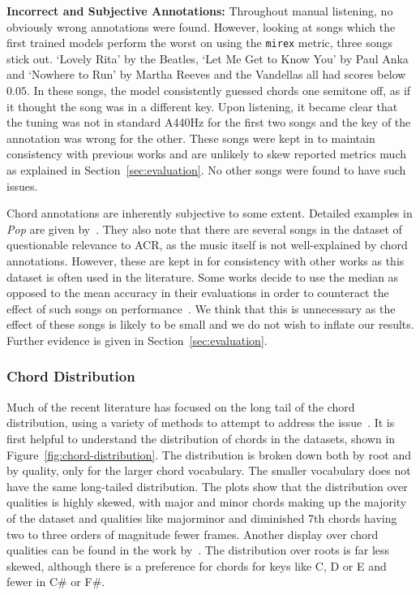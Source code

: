 \textbf{Incorrect and Subjective Annotations:} Throughout manual listening, no obviously wrong annotations were found. However, looking at songs which the first trained models perform the worst on using the \texttt{mirex} metric, three songs stick out. `Lovely Rita' by the Beatles, `Let Me Get to Know You' by Paul Anka and `Nowhere to Run' by Martha Reeves and the Vandellas all had scores below $0.05$. In these songs, the model consistently guessed chords one semitone off, as if it thought the song was in a different key. Upon listening, it became clear that the tuning was not in standard A440Hz for the first two songs and the key of the annotation was wrong for the other. These songs were kept in to maintain consistency with previous works and are unlikely to skew reported metrics much as explained in Section~\ref{sec:evaluation}. No other songs were found to have such issues.

Chord annotations are inherently subjective to some extent. Detailed examples in \emph{Pop} are given by~\citet{FourTimelyInsights}. They also note that there are several songs in the dataset of questionable relevance to ACR, as the music itself is not well-explained by chord annotations. However, these are kept in for consistency with other works as this dataset is often used in the literature. Some works decide to use the median as opposed to the mean accuracy in their evaluations in order to counteract the effect of such songs on performance~\citep{StructuredTraining}. We think that this is unnecessary as the effect of these songs is likely to be small and we do not wish to inflate our results. Further evidence is given in Section~\ref{sec:evaluation}.

\subsubsection{Chord Distribution}

Much of the recent literature has focused on the long tail of the chord distribution, using a variety of methods to attempt to address the issue~\citep{BalanceRandomForestACR,CurriculumLearning}. It is first helpful to understand the distribution of chords in the datasets, shown in Figure~\ref{fig:chord-distribution}. The distribution is broken down both by root and by quality, only for the larger chord vocabulary. The smaller vocabulary does not have the same long-tailed distribution. The plots show that the distribution over qualities is highly skewed, with major and minor chords making up the majority of the dataset and qualities like majorminor and diminished 7th chords having two to three orders of magnitude fewer frames. Another display over chord qualities can be found in the work by~\citet{ACRLargeVocab1}. The distribution over roots is far less skewed, although there is a preference for chords for keys like C, D or E and fewer in C\# or F\#.

